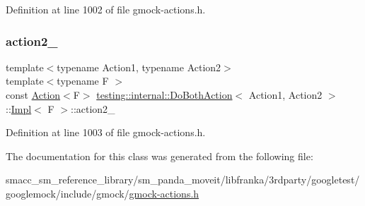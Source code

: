 Definition at line 1002 of file gmock-\/actions.\+h.

\mbox{\label{classtesting_1_1internal_1_1DoBothAction_1_1Impl_af1f725e8d028c532c07ee606df35dc44}} 
\subsubsection{\texorpdfstring{action2\+\_\+}{action2\_}}
{\footnotesize\ttfamily template$<$typename Action1, typename Action2$>$ \\
template$<$typename F $>$ \\
const \hyperlink{classtesting_1_1Action}{Action}$<$F$>$ \hyperlink{classtesting_1_1internal_1_1DoBothAction}{testing\+::internal\+::\+Do\+Both\+Action}$<$ Action1, Action2 $>$\+::\hyperlink{classtesting_1_1internal_1_1DoBothAction_1_1Impl}{Impl}$<$ F $>$\+::action2\+\_\+\hspace{0.3cm}{\ttfamily [private]}}



Definition at line 1003 of file gmock-\/actions.\+h.



The documentation for this class was generated from the following file\+:\begin{DoxyCompactItemize}
\item 
smacc\+\_\+sm\+\_\+reference\+\_\+library/sm\+\_\+panda\+\_\+moveit/libfranka/3rdparty/googletest/googlemock/include/gmock/\hyperlink{gmock-actions_8h}{gmock-\/actions.\+h}\end{DoxyCompactItemize}
